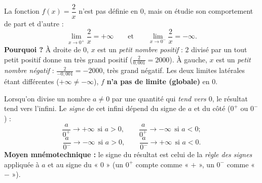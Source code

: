 \documentclass[11pt,a4paper]{article}
\begin{document}
\begin{exemple}
La fonction $f(x)=\dfrac2x$ n'est pas définie en $0$, mais on étudie son comportement de part et d'autre :
\[ \lim_{x\to 0^{+}}\frac2x=+\infty\qquad\text{et}\qquad \lim_{x\to 0^{-}}\frac2x=-\infty. \]
\textbf{Pourquoi ?} À droite de $0$, $x$ est un \emph{petit nombre positif} : $2$ divisé par un
tout petit positif donne un très grand positif ($\frac{2}{0{,}001}=2000$). À gauche, $x$ est un
\emph{petit nombre négatif} : $\frac{2}{-0{,}001}=-2000$, très grand négatif. Les deux limites
latérales étant différentes ($+\infty\neq-\infty$), $f$ \textbf{n'a pas de limite (globale)} en $0$.
\end{exemple}

\begin{center}
\end{center}

\begin{remarque}
Lorsqu'on divise un nombre $a\neq 0$ par une quantité qui \emph{tend vers $0$}, le résultat tend
vers l'infini. Le \emph{signe} de cet infini dépend du signe de $a$ et du côté ($0^+$ ou $0^-$) :
\[ \frac{a}{0^{+}}\to +\infty\ \ \text{si }a>0,\qquad \frac{a}{0^{+}}\to -\infty\ \ \text{si }a<0; \]
\[ \frac{a}{0^{-}}\to -\infty\ \ \text{si }a>0,\qquad \frac{a}{0^{-}}\to +\infty\ \ \text{si }a<0. \]
\textbf{Moyen mnémotechnique :} le signe du résultat est celui de la \emph{règle des signes}
appliquée à $a$ et au signe du « $0$ » (un $0^+$ compte comme « $+$ », un $0^-$ comme « $-$ »).
\end{remarque}
\end{document}
